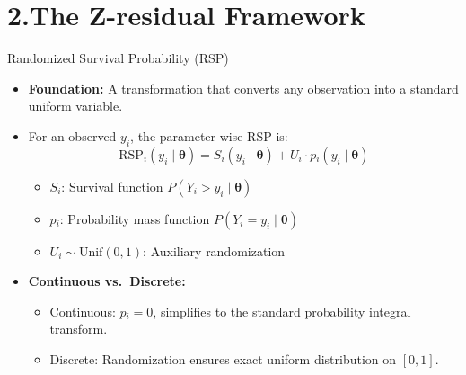 \documentclass[
  ignorenonframetext,
]{beamer}
\providecommand{\tightlist}{%
  \setlength{\itemsep}{0pt}\setlength{\parskip}{0pt}}
\begin{document}
\section{2.The Z-residual Framework}\label{the-z-residual-framework}

\begin{frame}{Randomized Survival Probability (RSP)}
\protect{}\label{randomized-survival-probability-rsp}
\begin{itemize}
\tightlist
\item
  \textbf{Foundation:} A transformation that converts any observation
  into a standard uniform variable.
\item
  For an observed \(y_i\), the parameter-wise RSP is:
  \[ \text{RSP}_i(y_i \mid \boldsymbol{\theta}) = S_i(y_i \mid \boldsymbol{\theta}) + U_i \cdot p{ }_i(y_i \mid \boldsymbol{\theta}) \]

  \begin{itemize}
  \tightlist
  \item
    \(S_i\): Survival function \(P(Y_i > y_i \mid \boldsymbol{\theta})\)
  \item
    \(p{ }_i\): Probability mass function
    \(P(Y_i = y_i \mid \boldsymbol{\theta})\)
  \item
    \(U_i \sim \text{Unif}(0,1)\): Auxiliary randomization
  \end{itemize}
\item
  \textbf{Continuous vs.~Discrete:}

  \begin{itemize}
  \tightlist
  \item
    Continuous: \(p{ }_i = 0\), simplifies to the standard probability
    integral transform.
  \item
    Discrete: Randomization ensures exact uniform distribution on
    \([0,1]\).
  \end{itemize}
\end{itemize}
\end{frame}
\end{document}
